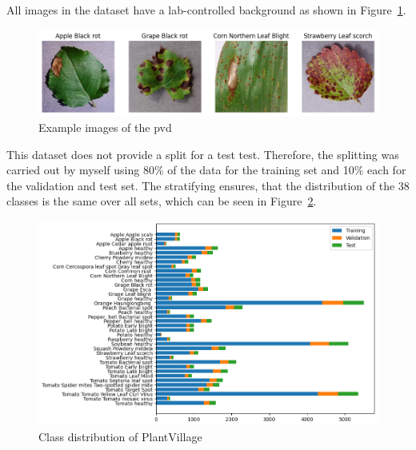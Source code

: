 All images in the dataset have a lab-controlled background as shown in Figure~\ref{fig:example_images_of_plantvillage}.
\begin{figure}[H]
    \begin{center}
    \includegraphics[width=15cm]{../images/example_images_of_plantvillage.png}
    \caption{Example images of the \gls{pvd}}\label{fig:example_images_of_plantvillage}
    \end{center}
\end{figure}

This dataset does not provide a split for a test test. Therefore, the splitting was carried out by myself using 80\% of the data for the training set and 10\% each for the validation and test set. The stratifying ensures, that the distribution of the 38 classes is the same over all sets, which can be seen in Figure~\ref{fig:class_distribution_of_plantvillage}. 
\begin{figure}[H]
    \begin{center}
    \includegraphics[width=15cm]{../images/class_distribution_of_plantvillage.png}
    \caption{Class distribution of PlantVillage}\label{fig:class_distribution_of_plantvillage}
    \end{center}
\end{figure}





